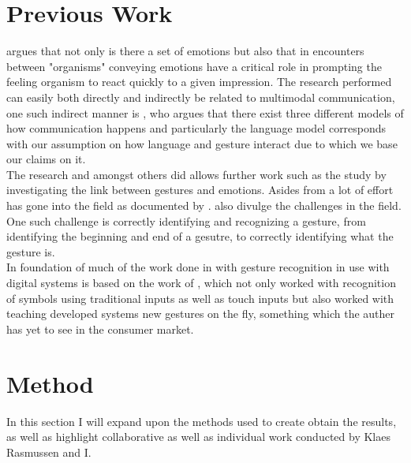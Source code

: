 \documentclass[11pt, a4paper]{article}
\begin{document}
\section{Previous Work}
 argues that not only is there a set of emotions but also that in encounters between "organisms" conveying emotions have a critical role in prompting the feeling organism to react quickly to a given impression. The research  performed can easily both directly and indirectly be related to multimodal communication, one such indirect manner is , who argues that there exist three different models of how communication happens and particularly the language model corresponds with our assumption on how language and gesture interact due to which we base our claims on it.\\

The research  and  amongst others did allows further work such as the study by  investigating the link between gestures and emotions. Asides from  a lot of effort has gone into the field as documented by .  also divulge the challenges in the field. One such challenge is correctly identifying and recognizing a gesture, from identifying the beginning and end of a gesutre, to correctly identifying what the gesture is.\\

In foundation of much of the work done in with gesture recognition in use with digital systems is based on the work of , which not only worked with recognition of symbols using traditional inputs as well as touch inputs but also worked with teaching developed systems new gestures on the fly, something which the auther has yet to see in the consumer market.
\section{Method}
In this section I will expand upon the methods used to create obtain the results, as well as highlight collaborative as well as individual work conducted by Klaes Rasmussen and I.\\
\end{document}
